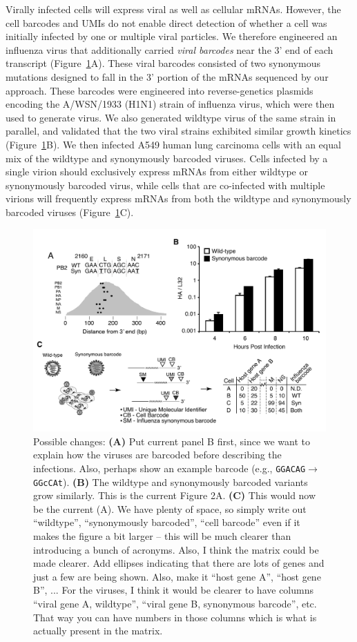 \documentclass[9pt,lineno]{elife}
\begin{document}
Virally infected cells will express viral as well as cellular mRNAs.
However, the cell barcodes and UMIs do not enable direct detection of whether a cell was initially infected by one or multiple viral particles.
We therefore engineered an influenza virus that additionally carried \emph{viral barcodes} near the 3' end of each transcript (Figure~\ref{fig:workflow}A).
These viral barcodes consisted of two synonymous mutations designed to fall in the 3' portion of the mRNAs sequenced by our approach.
These barcodes were engineered into reverse-genetics plasmids encoding the A/WSN/1933 (H1N1) strain of influenza virus, which were then used to generate virus.
We also generated wildtype virus of the same strain in parallel, and validated that the two viral strains exhibited similar growth kinetics (Figure~\ref{fig:workflow}B).
We then infected A549 human lung carcinoma cells with an equal mix of the wildtype and synonymously barcoded viruses.
Cells infected by a single virion should exclusively express mRNAs from either wildtype or synonymously barcoded virus, while cells that are co-infected with multiple virions will frequently express mRNAs from both the wildtype and synonymously barcoded viruses (Figure~\ref{fig:workflow}C).
\begin{figure}
\includegraphics[width=0.8\linewidth]{figures/Workflow/workflow.pdf}
\caption{\label{fig:workflow}
Possible changes:
{\bf (A)} Put current panel B first, since we want to explain how the viruses are barcoded before describing the infections. Also, perhaps show an example barcode (e.g., \texttt{GGACAG}$\rightarrow$\texttt{GGcCAt}).
{\bf (B)} The wildtype and synonymously barcoded variants grow similarly.
This is the current Figure 2A.
{\bf (C)} This would now be the current (A). We have plenty of space, so simply write out ``wildtype'', ``synonymously barcoded'', ``cell barcode'' even if it makes the figure a bit larger -- this will be much clearer than introducing a bunch of acronyms.
Also, I think the matrix could be made clearer.
Add ellipses indicating that there are lots of genes and just a few are being shown. Also, make it ``host gene A'', ``host gene B'', ...
For the viruses, I think it would be clearer to have columns ``viral gene A, wildtype'', ``viral gene B, synonymous barcode'', etc.
That way you can have numbers in those columns which is what is actually present in the matrix.
}
\end{figure}
\end{document}
